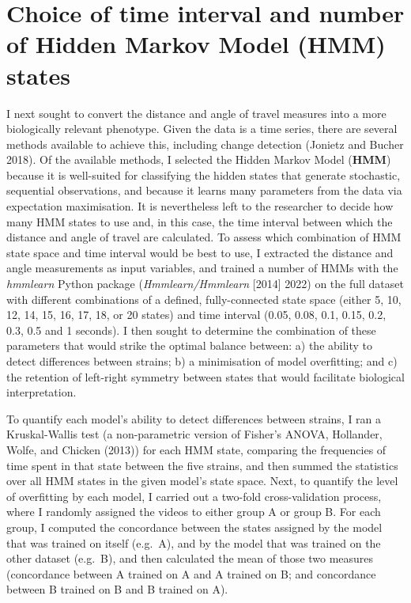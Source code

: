 \documentclass[
]{book}
\begin{document}
\hypertarget{pilot-hmm-params}{%
\section{Choice of time interval and number of Hidden Markov Model (HMM) states}\label{pilot-hmm-params}}

I next sought to convert the distance and angle of travel measures into a more biologically relevant phenotype. Given the data is a time series, there are several methods available to achieve this, including change detection (Jonietz and Bucher 2018). Of the available methods, I selected the Hidden Markov Model (\textbf{HMM}) because it is well-suited for classifying the hidden states that generate stochastic, sequential observations, and because it learns many parameters from the data via expectation maximisation. It is nevertheless left to the researcher to decide how many HMM states to use and, in this case, the time interval between which the distance and angle of travel are calculated. To assess which combination of HMM state space and time interval would be best to use, I extracted the distance and angle measurements as input variables, and trained a number of HMMs with the \emph{hmmlearn} Python package (\emph{Hmmlearn/Hmmlearn} {[}2014{]} 2022) on the full dataset with different combinations of a defined, fully-connected state space (either 5, 10, 12, 14, 15, 16, 17, 18, or 20 states) and time interval (0.05, 0.08, 0.1, 0.15, 0.2, 0.3, 0.5 and 1 seconds). I then sought to determine the combination of these parameters that would strike the optimal balance between: a) the ability to detect differences between strains; b) a minimisation of model overfitting; and c) the retention of left-right symmetry between states that would facilitate biological interpretation.

To quantify each model's ability to detect differences between strains, I ran a Kruskal-Wallis test (a non-parametric version of Fisher's ANOVA, Hollander, Wolfe, and Chicken (2013)) for each HMM state, comparing the frequencies of time spent in that state between the five strains, and then summed the statistics over all HMM states in the given model's state space. Next, to quantify the level of overfitting by each model, I carried out a two-fold cross-validation process, where I randomly assigned the videos to either group A or group B. For each group, I computed the concordance between the states assigned by the model that was trained on itself (e.g.~A), and by the model that was trained on the other dataset (e.g.~B), and then calculated the mean of those two measures (concordance between A trained on A and A trained on B; and concordance between B trained on B and B trained on A).
\end{document}
